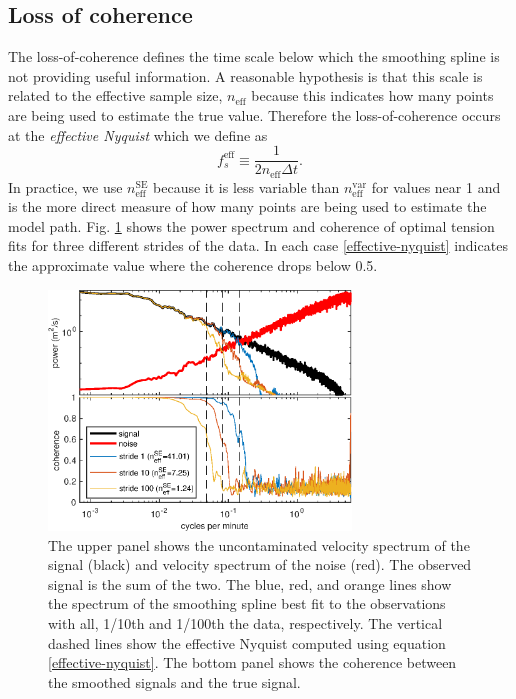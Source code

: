 \documentclass{ametsoc}
\begin{document}
\subsection{Loss of coherence}
\label{subsec:loss_of_coherence}

The loss-of-coherence defines the time scale below which the smoothing spline is not providing useful information. A reasonable hypothesis is that this scale is related to the effective sample size, $n_{\textrm{eff}}$ because this indicates how many points are being used to estimate the true value. Therefore the loss-of-coherence occurs at the \emph{effective Nyquist} which we define as
\begin{equation}
\label{effective-nyquist}
    f_s^{\textrm{eff}} \equiv \frac{1}{2 n_{\textrm{eff}} \Delta t}.
\end{equation}
In practice, we use $n^\textrm{SE}_\textrm{eff}$ because it is less variable than $n^\textrm{var}_\textrm{eff}$ for values near 1 and is the more direct measure of how many points are being used to estimate the model path. 
Fig. \ref{synthetic_process_and_spectrum} shows the power spectrum and coherence of optimal tension fits for three different strides of the data. In each case \eqref{effective-nyquist} indicates the approximate value where the coherence drops below 0.5.

\begin{figure}
  \centerline{\includegraphics[width=19pc,angle=0]{synthetic_process_and_spectrum_slope2degree3.eps}}
  \caption{The upper panel shows the uncontaminated velocity spectrum of the signal (black) and velocity spectrum of the noise (red). The observed signal is the sum of the two. The blue, red, and orange lines show the spectrum of the smoothing spline best fit to the observations with all, 1/10th and 1/100th the data, respectively. The vertical dashed lines show the effective Nyquist computed using equation \ref{effective-nyquist}. The bottom panel shows the coherence between the smoothed signals and the true signal.}
  \label{synthetic_process_and_spectrum}
\end{figure}
\end{document}
